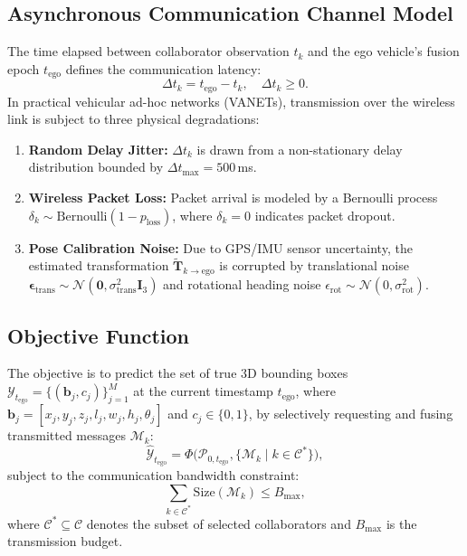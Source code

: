 \documentclass[10pt,journal,compsoc]{IEEEtran}
\begin{document}
\subsection{Asynchronous Communication Channel Model}
The time elapsed between collaborator observation $t_k$ and the ego vehicle's fusion epoch $t_{\text{ego}}$ defines the communication latency:
\begin{equation}
\Delta t_k = t_{\text{ego}} - t_k, \quad \Delta t_k \ge 0.
\end{equation}
In practical vehicular ad-hoc networks (VANETs), transmission over the wireless link is subject to three physical degradations:
\begin{enumerate}
    \item \textbf{Random Delay Jitter:} $\Delta t_k$ is drawn from a non-stationary delay distribution bounded by $\Delta t_{\max} = 500$\,ms.
    \item \textbf{Wireless Packet Loss:} Packet arrival is modeled by a Bernoulli process $\delta_k \sim \mathrm{Bernoulli}(1 - p_{\text{loss}})$, where $\delta_k = 0$ indicates packet dropout.
    \item \textbf{Pose Calibration Noise:} Due to GPS/IMU sensor uncertainty, the estimated transformation $\tilde{\mathbf{T}}_{k \to \text{ego}}$ is corrupted by translational noise $\mathbf{\epsilon}_{\text{trans}} \sim \mathcal{N}(\mathbf{0}, \sigma_{\text{trans}}^2 \mathbf{I}_3)$ and rotational heading noise $\epsilon_{\text{rot}} \sim \mathcal{N}(0, \sigma_{\text{rot}}^2)$.
\end{enumerate}

\subsection{Objective Function}
The objective is to predict the set of true 3D bounding boxes $\mathcal{Y}_{t_{\text{ego}}} = \{(\mathbf{b}_j, c_j)\}_{j=1}^{M}$ at the current timestamp $t_{\text{ego}}$, where $\mathbf{b}_j = [x_j, y_j, z_j, l_j, w_j, h_j, \theta_j]$ and $c_j \in \{0, 1\}$, by selectively requesting and fusing transmitted messages $\mathcal{M}_k$:
\begin{equation}
\hat{\mathcal{Y}}_{t_{\text{ego}}} = \Phi\Big(\mathcal{P}_{0, t_{\text{ego}}}, \{\mathcal{M}_k \mid k \in \mathcal{C}^*\}\Big),
\end{equation}
subject to the communication bandwidth constraint:
\begin{equation}
\sum_{k \in \mathcal{C}^*} \mathrm{Size}(\mathcal{M}_k) \le B_{\max},
\end{equation}
where $\mathcal{C}^* \subseteq \mathcal{C}$ denotes the subset of selected collaborators and $B_{\max}$ is the transmission budget.
\end{document}
